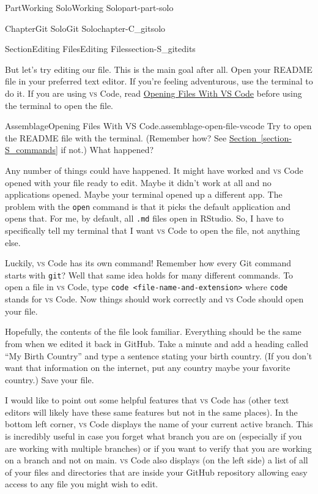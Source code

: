 \documentclass[oneside,10pt,]{book}
\newcommand{\xreffont}{\relax}
\newcommand{\mono}[1]{\texttt{#1}}
\newcommand{\initialism}[1]{\textsc{\MakeLowercase{#1}}}
\DeclareRobustCommand{\initialismintitle}[1]{\texorpdfstring{#1}{#1}}
\begin{document}
\begin{partptx}{Part}{Working Solo}{}{Working Solo}{}{}{part-part-solo}
\begin{chapterptx}{Chapter}{Git Solo}{}{Git Solo}{}{}{chapter-C_gitsolo}
\begin{sectionptx}{Section}{Editing Files}{}{Editing Files}{}{}{section-S_gitedits}
\par
But let's try editing our file. This is the main goal after all. Open your README file in your preferred text editor. If you're feeling adventurous, use the terminal to do it. If you are using \initialism{VS} Code, read \hyperref[assemblage-open-file-vscode]{Opening Files With \initialismintitle{VS} Code} before using the terminal to open the file.%
\begin{assemblage}{Assemblage}{Opening Files With \initialismintitle{VS} Code.}{assemblage-open-file-vscode}%
Try to open the README file with the terminal. (Remember how? See \hyperref[section-S_commands]{Section~{\xreffont\ref{section-S_commands}}} if not.) What happened?%
\par
Any number of things could have happened. It might have worked and \initialism{VS} Code opened with your file ready to edit. Maybe it didn't work at all and no applications opened. Maybe your terminal opened up a different app. The problem with the \mono{open} command is that it picks the default application and opens that. For me, by default, all \mono{.md} files open in RStudio. So, I have to specifically tell my terminal that I want \initialism{VS} Code to open the file, not anything else.%
\par
Luckily, \initialism{VS} Code has its own command! Remember how every Git command starts with \mono{git}? Well that same idea holds for many different commands. To open a file in \initialism{VS} Code, type \mono{code <file-name-and-extension>} where \mono{code} stands for \initialism{VS} Code. Now things should work correctly and \initialism{VS} Code should open your file.%
\end{assemblage}
Hopefully, the contents of the file look familiar. Everything should be the same from when we edited it back in GitHub. Take a minute and add a heading called ``My Birth Country'' and type a sentence stating your birth country. (If you don't want that information on the internet, put any country \textellipsis{} maybe your favorite country.) Save your file.%
\par
I would like to point out some helpful features that \initialism{VS} Code has (other text editors will likely have these same features but not in the same places). In the bottom left corner, \initialism{VS} Code displays the name of your current active branch. This is incredibly useful in case you forget what branch you are on (especially if you are working with multiple branches) or if you want to verify that you are working on a branch and not on main. \initialism{VS} Code also displays (on the left side) a list of all of your files and directories that are inside your GitHub repository allowing easy access to any file you might wish to edit.%

\end{sectionptx}
\end{chapterptx}
\end{partptx}
\end{document}
